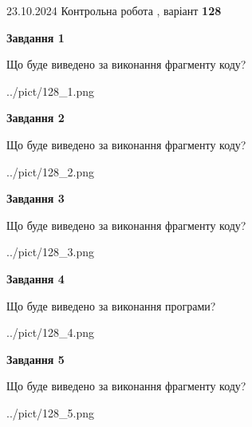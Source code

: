 \documentclass[12pt, ukrainian]{article}
\begin{document}
{\Large{23.10.2024 Контрольна робота , варіант  \No \textbf { 128 }\par}}
{
\begin {large}
{\begin {center}\textbf{Завдання 1}\end {center}}

Що буде виведено за виконання фрагменту коду?\par
\begin{center}
	{../pict/128_1.png}
\end{center}
\newpage

{\begin {center}\textbf{Завдання 2}\end {center}}

Що буде виведено за виконання фрагменту коду?\par
\begin{center}
	{../pict/128_2.png}
\end{center}
\newpage

{\begin {center}\textbf{Завдання 3}\end {center}}

Що буде виведено за виконання фрагменту коду?\par
\begin{center}
	{../pict/128_3.png}
\end{center}
\newpage

{\begin {center}\textbf{Завдання 4}\end {center}}

Що буде виведено за виконання програми?\par
\begin{center}
	{../pict/128_4.png}
\end{center}
\newpage

{\begin {center}\textbf{Завдання 5}\end {center}}

Що буде виведено за виконання фрагменту коду?\par
\begin{center}
	{../pict/128_5.png}
\end{center}
\newpage


\end{large}}
\end{document}
